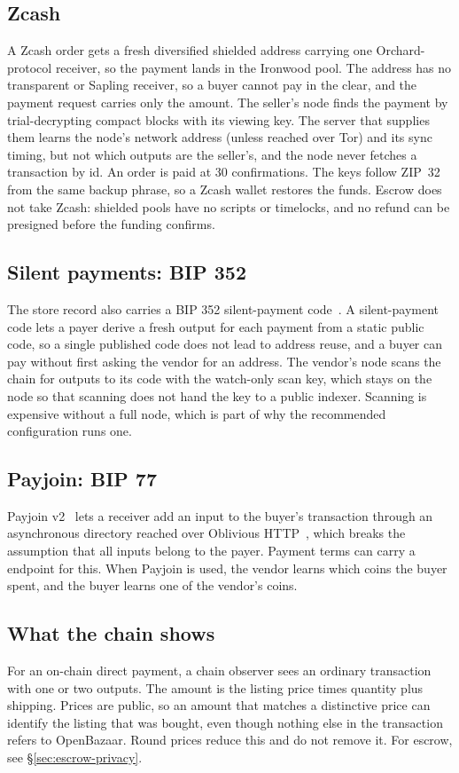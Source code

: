 \subsection{Zcash}

A Zcash order gets a fresh diversified shielded address carrying one Orchard-protocol receiver, so the payment lands in the Ironwood pool. The address has no transparent or Sapling receiver, so a buyer cannot pay in the clear, and the payment request carries only the amount. The seller's node finds the payment by trial-decrypting compact blocks with its viewing key. The server that supplies them learns the node's network address (unless reached over Tor) and its sync timing, but not which outputs are the seller's, and the node never fetches a transaction by id. An order is paid at 30 confirmations. The keys follow ZIP~32 from the same backup phrase, so a Zcash wallet restores the funds. Escrow does not take Zcash: shielded pools have no scripts or timelocks, and no refund can be presigned before the funding confirms.

\subsection{Silent payments: BIP 352}

The store record also carries a BIP 352 silent-payment code~\citep{bip352}. A silent-payment code lets a payer derive a fresh output for each payment from a static public code, so a single published code does not lead to address reuse, and a buyer can pay without first asking the vendor for an address. The vendor's node scans the chain for outputs to its code with the watch-only scan key, which stays on the node so that scanning does not hand the key to a public indexer. Scanning is expensive without a full node, which is part of why the recommended configuration runs one.

\subsection{Payjoin: BIP 77}

Payjoin v2~\citep{bip77} lets a receiver add an input to the buyer's transaction through an asynchronous directory reached over Oblivious HTTP~\citep{rfc9458}, which breaks the assumption that all inputs belong to the payer. Payment terms can carry a  endpoint for this. When Payjoin is used, the vendor learns which coins the buyer spent, and the buyer learns one of the vendor's coins.

\subsection{What the chain shows}

For an on-chain direct payment, a chain observer sees an ordinary transaction with one or two outputs. The amount is the listing price times quantity plus shipping. Prices are public, so an amount that matches a distinctive price can identify the listing that was bought, even though nothing else in the transaction refers to OpenBazaar. Round prices reduce this and do not remove it. For escrow, see \S\ref{sec:escrow-privacy}.
